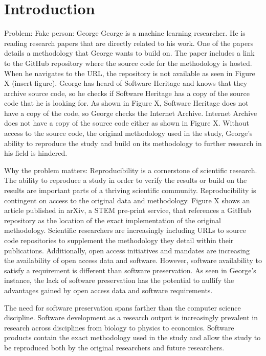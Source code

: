 \chapter{Introduction}
\label{ch:introduction}


Problem: 
Fake person: George
George is a machine learning researcher. He is reading research papers that are directly related to his work. One of the papers details a methodology that George wants to build on. The paper includes a link to the GitHub repository where the source code for the methodology is hosted. When he navigates to the URL, the repository is not available as seen in Figure X (insert figure). George has heard of Software Heritage and knows that they archive source code, so he checks if Software Heritage has a copy of the source code that he is looking for. As shown in Figure X, Software Heritage does not have a copy of the code, so George checks the Internet Archive. Internet Archive does not have a copy of the source code either as shown in Figure X. Without access to the source code, the original methodology used in the study, George's ability to reproduce the study and build on its methodology to further research in his field is hindered. 

Why the problem matters:
Reproducibility is a cornerstone of scientific research. The ability to reproduce a study in order to verify the results or build on the results are important parts of a thriving scientific community. Reproducibility is contingent on access to the original data and methodology. Figure X shows an article published in arXiv, a STEM pre-print service, that references a GitHub repository as the location of the exact implementation of the original methodology. Scientific researchers are increasingly including URLs to source code repositories to supplement the methodology they detail within their publications. Additionally, open access initiatives and mandates are increasing the availability of open access data and software. However, software availability to satisfy a requirement is different than software preservation. As seen in George's instance, the lack of software preservation has the potential to nullify the advantages gained by open access data and software requirements. 

The need for software preservation spans farther than the computer science discipline. Software development as a research output is increasingly prevalent in research across disciplines from biology to physics to economics. Software products contain the exact methodology used in the study and allow the study to be reproduced both by the original researchers and future researchers. 

